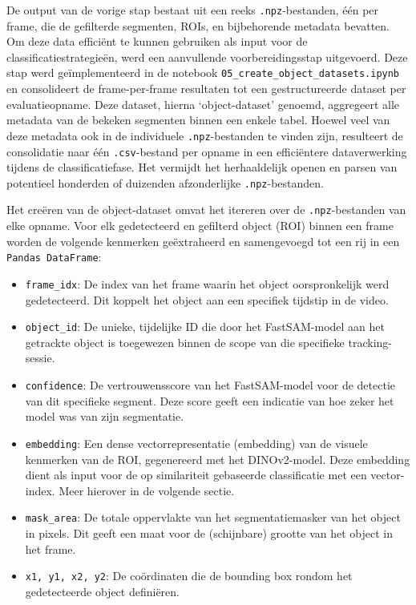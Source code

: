 De output van de vorige stap bestaat uit een reeks \texttt{.npz}-bestanden, één per frame, 
die de gefilterde segmenten, ROIs, en bijbehorende metadata bevatten. 
Om deze data efficiënt te kunnen gebruiken als input voor de classificatiestrategieën, werd een aanvullende voorbereidingsstap uitgevoerd. 
Deze stap werd geïmplementeerd in de notebook \texttt{05\_create\_object\_datasets.ipynb} en consolideert de frame-per-frame 
resultaten tot een gestructureerde dataset per evaluatieopname. 
Deze dataset, hierna `object-dataset' genoemd, aggregeert alle metadata van de bekeken segmenten binnen een enkele tabel.
Hoewel veel van deze metadata ook in de individuele \texttt{.npz}-bestanden te vinden zijn, resulteert de consolidatie 
naar één \texttt{.csv}-bestand per opname in een efficiëntere dataverwerking tijdens de classificatiefase. 
Het vermijdt het herhaaldelijk openen en parsen van potentieel honderden of duizenden afzonderlijke \texttt{.npz}-bestanden.

Het creëren van de object-dataset omvat het itereren over de \texttt{.npz}-bestanden van elke opname. 
Voor elk gedetecteerd en gefilterd object (ROI) binnen een frame worden de volgende kenmerken geëxtraheerd en samengevoegd tot een rij in een \texttt{Pandas DataFrame}:
\begin{itemize}
    \item \texttt{frame\_idx}: De index van het frame waarin het object oorspronkelijk werd gedetecteerd. 
    Dit koppelt het object aan een specifiek tijdstip in de video.
    \item \texttt{object\_id}: De unieke, tijdelijke ID die door het FastSAM-model aan het getrackte object 
    is toegewezen binnen de scope van die specifieke tracking-sessie.
    \item \texttt{confidence}: De vertrouwensscore van het FastSAM-model voor de detectie van dit specifieke segment. 
    Deze score geeft een indicatie van hoe zeker het model was van zijn segmentatie.
    \item \texttt{embedding}: Een dense vectorrepresentatie (embedding) van de visuele kenmerken van de ROI, 
    gegenereerd met het DINOv2-model. 
    Deze embedding dient als input voor de op similariteit gebaseerde classificatie met een vector-index.
    Meer hierover in de volgende sectie.
    \item \texttt{mask\_area}: De totale oppervlakte van het segmentatiemasker van het object in pixels. 
    Dit geeft een maat voor de (schijnbare) grootte van het object in het frame.
    \item \texttt{x1, y1, x2, y2}: De coördinaten die de bounding box rondom het gedetecteerde object definiëren. 
\end{itemize}

